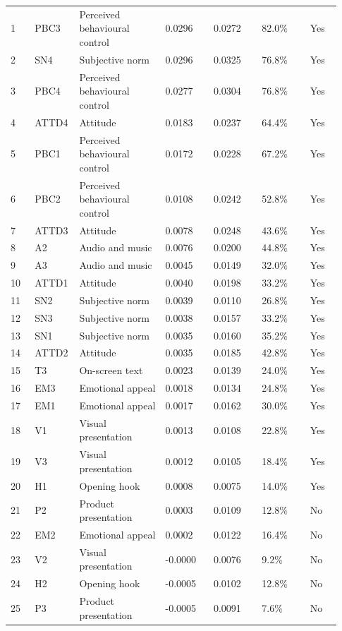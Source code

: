 \documentclass[10pt,a4paper]{article}
\begin{document}
\begin{landscape}
\begin{longtable}{@{}C{0.07\linewidth}C{0.10\linewidth}L{0.25\linewidth}C{0.14\linewidth}C{0.14\linewidth}C{0.14\linewidth}C{0.09\linewidth}@{}}
1 & PBC3 & Perceived behavioural control & 0.0296 & 0.0272 & 82.0\% & Yes \\
2 & SN4 & Subjective norm & 0.0296 & 0.0325 & 76.8\% & Yes \\
3 & PBC4 & Perceived behavioural control & 0.0277 & 0.0304 & 76.8\% & Yes \\
4 & ATTD4 & Attitude & 0.0183 & 0.0237 & 64.4\% & Yes \\
5 & PBC1 & Perceived behavioural control & 0.0172 & 0.0228 & 67.2\% & Yes \\
6 & PBC2 & Perceived behavioural control & 0.0108 & 0.0242 & 52.8\% & Yes \\
7 & ATTD3 & Attitude & 0.0078 & 0.0248 & 43.6\% & Yes \\
8 & A2 & Audio and music & 0.0076 & 0.0200 & 44.8\% & Yes \\
9 & A3 & Audio and music & 0.0045 & 0.0149 & 32.0\% & Yes \\
10 & ATTD1 & Attitude & 0.0040 & 0.0198 & 33.2\% & Yes \\
11 & SN2 & Subjective norm & 0.0039 & 0.0110 & 26.8\% & Yes \\
12 & SN3 & Subjective norm & 0.0038 & 0.0157 & 33.2\% & Yes \\
13 & SN1 & Subjective norm & 0.0035 & 0.0160 & 35.2\% & Yes \\
14 & ATTD2 & Attitude & 0.0035 & 0.0185 & 42.8\% & Yes \\
15 & T3 & On-screen text & 0.0023 & 0.0139 & 24.0\% & Yes \\
16 & EM3 & Emotional appeal & 0.0018 & 0.0134 & 24.8\% & Yes \\
17 & EM1 & Emotional appeal & 0.0017 & 0.0162 & 30.0\% & Yes \\
18 & V1 & Visual presentation & 0.0013 & 0.0108 & 22.8\% & Yes \\
19 & V3 & Visual presentation & 0.0012 & 0.0105 & 18.4\% & Yes \\
20 & H1 & Opening hook & 0.0008 & 0.0075 & 14.0\% & Yes \\
21 & P2 & Product presentation & 0.0003 & 0.0109 & 12.8\% & No \\
22 & EM2 & Emotional appeal & 0.0002 & 0.0122 & 16.4\% & No \\
23 & V2 & Visual presentation & -0.0000 & 0.0076 & 9.2\% & No \\
24 & H2 & Opening hook & -0.0005 & 0.0102 & 12.8\% & No \\
25 & P3 & Product presentation & -0.0005 & 0.0091 & 7.6\% & No \\

\end{longtable}
\end{landscape}
\end{document}
